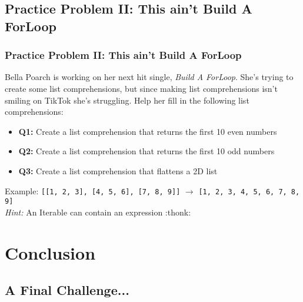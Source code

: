 \documentclass[hyperref={colorlinks,citecolor=blue,linkcolor=blue,urlcolor=blue}]{beamer}
\begin{document}
\subsection{Practice Problem II: This ain't Build A ForLoop}
\begin{frame}
  \frametitle{Practice Problem II: This ain't Build A ForLoop}
  Bella Poarch is working on her next hit single, \textit{Build A ForLoop}. She's trying to create some list comprehensions, but since making list comprehensions isn't smiling on TikTok she's struggling. Help her fill in the following list comprehensions:
  
  \begin{itemize}
    \item \textbf{Q1:} Create a list comprehension that returns the first 10 even numbers
    \item \textbf{Q2:} Create a list comprehension that returns the first 10 odd numbers
    \item \textbf{Q3:} Create a list comprehension that flattens a 2D list
  \end{itemize}
  Example:
  \texttt{[[1, 2, 3], [4, 5, 6], [7, 8, 9]]} $\rightarrow$ \texttt{[1, 2, 3, 4, 5, 6, 7, 8, 9]}\\
  \textit{Hint:} An Iterable can contain an expression :thonk:

\end{frame}

\section{Conclusion}
\subsection{A Final Challenge...}
\end{document}
